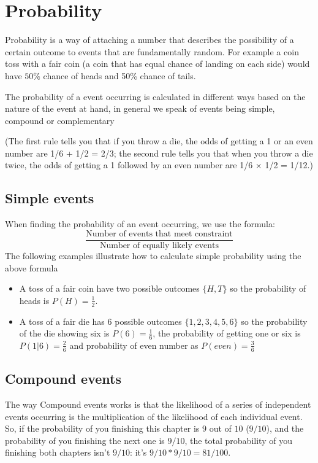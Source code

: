 \section{Probability}
Probability is a way of attaching a number that describes the possibility of a certain outcome to events that are fundamentally random. For example a coin toss with a fair coin (a coin that has equal chance of landing on each side) would have $50\%$ chance of heads and 50\% chance of tails.

The probability of a event occurring is calculated in different ways based on the nature of the event at hand, in general we speak of events being simple, compound or complementary


(The first rule tells you that if you throw a die, the odds of getting a 1 or an even number are 1/6 + 1/2 = 2/3; the second rule tells you that when you throw a die twice, the odds of getting a 1 followed by an even number are 1/6 × 1/2 = 1/12.)

\subsection{Simple events}
When finding the probability of an event occurring, we use the formula:
\[
\frac{\text{Number of events that meet constraint}}{\text{Number of equally likely events}}
\]
The following examples illustrate how to calculate simple probability using the above formula
\begin{itemize}
\item A toss of a fair coin have two possible outcomes $\{H,T\}$ so the probability of heads is
$P(H) = \frac{1}{2}$.
\item A toss of a fair die has 6 possible outcomes $\{1, 2, 3, 4, 5, 6\}$ so the probability of the die showing six is $P(6) = \frac{1}{6}$, the probability of getting one or six is $P(1|6) = \frac{2}{6}$ and probability of even number as $P(even) = \frac{3}{6}$
\end{itemize}

\subsection{Compound events}
The way Compound events works is that the likelihood of a series of independent events occurring is the multiplication of the likelihood of each individual event. So, if the probability of you finishing this chapter is $9$ out of $10$ ($9/10$), and the probability of you finishing the next one is $9/10$, the total probability of you finishing both chapters isn't $9/10$: it's $9/10 * 9/10 = 81/100$.

